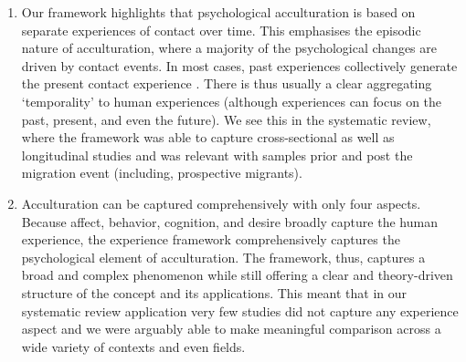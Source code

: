 \documentclass[man, 12pt, a4paper, mask]{apa7}
\begin{document}
\begin{enumerate}
\item Our framework highlights that psychological acculturation is based on separate experiences of contact over time. This emphasises the episodic nature of acculturation, where a majority of the psychological changes are driven by contact events. In most cases, past experiences collectively generate the present contact experience \citep[also see][]{Husserl1959, Heidegger1978}. There is thus usually a clear aggregating `temporality' to human experiences (although experiences can focus on the past, present, and even the future). We see this in the systematic review, where the framework was able to capture cross-sectional as well as longitudinal studies and was relevant with samples prior and post the migration event (including, prospective migrants). 

\item Acculturation can be captured comprehensively with only four aspects. Because affect, behavior, cognition, and desire broadly capture the human experience, the experience framework comprehensively captures the psychological element of acculturation. The framework, thus, captures a broad and complex phenomenon while still offering a clear and theory-driven structure of the concept and its applications. This meant that in our systematic review application very few studies did not capture any experience aspect and we were arguably able to make meaningful comparison across a wide variety of contexts and even fields.


\end{enumerate}
\end{document}
